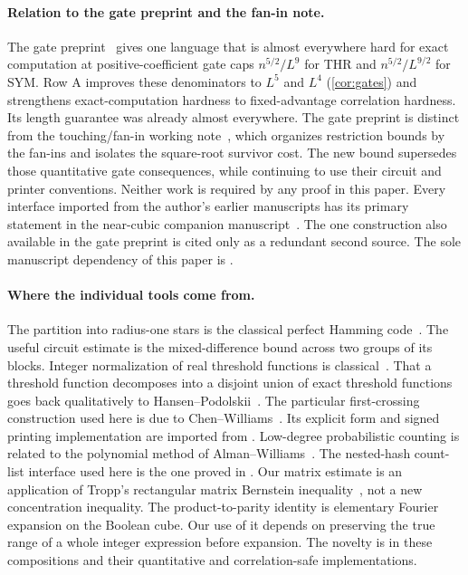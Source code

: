 \documentclass[11pt,letterpaper]{article}
\theoremstyle{definition}
\theoremstyle{remark}
\begin{document}
\paragraph{Relation to the gate preprint and the fan-in note.}
The gate preprint~\cite{NagGate} gives one language that is almost
everywhere hard for exact computation at positive-coefficient gate caps
$n^{5/2}/L^9$ for THR and $n^{5/2}/L^{9/2}$ for SYM. Row A improves
these denominators to $L^5$ and $L^4$ (\cref{cor:gates}) and
strengthens exact-computation
hardness to fixed-advantage correlation hardness. Its length guarantee
was already almost everywhere. The gate preprint is distinct from the
touching/fan-in working note~\cite{NagTouching}, which organizes
restriction bounds by the fan-ins and isolates the square-root survivor
cost. The new bound supersedes those quantitative gate
consequences, while continuing to use their circuit and printer
conventions. Neither work is required by any proof in this paper.
Every interface imported from the author's earlier manuscripts has its
primary statement in the near-cubic companion
manuscript~\cite{NagCubic}. The one construction also
available in the gate preprint is cited only as a redundant second
source. The sole manuscript dependency of this paper is
\cite{NagCubic}.

\paragraph{Where the individual tools come from.}
The partition into radius-one stars is the classical perfect Hamming
code~\cite{Hamming}. The useful circuit estimate is the mixed-difference
bound across two groups of its blocks. Integer normalization of real
threshold functions is classical~\cite{MurogaTodaTakasu}.
That a threshold function decomposes into a disjoint union of exact
threshold functions goes back qualitatively to
Hansen--Podolskii~\cite{HansenPodolskii}. The particular
first-crossing construction used here is due to
Chen--Williams~\cite[Proposition 18(2), Appendix B]{ChenWilliams}.
Its explicit form and signed printing implementation are imported
from \cite{NagCubic,NagGate}. Low-degree probabilistic counting is related
to the polynomial method of Alman--Williams~\cite{AlmanWilliams}.
The nested-hash count-list interface used here is the one proved in
\cite{NagCubic}. Our matrix estimate is an application of Tropp's
rectangular matrix Bernstein inequality~\cite[Theorem 1.6]{Tropp},
not a new concentration inequality. The product-to-parity identity is
elementary Fourier expansion on the Boolean cube. Our use of it depends
on preserving the true range of a whole integer expression before
expansion. The novelty is in these compositions and their quantitative
and correlation-safe implementations.
\end{document}
